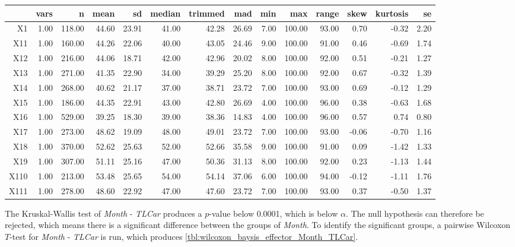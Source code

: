 \begin{tabular}{rrrrrrrrrrrrrr}
  \hline
 & vars & n & mean & sd & median & trimmed & mad & min & max & range & skew & kurtosis & se \\ 
  \hline
X1 & 1.00 & 118.00 & 44.60 & 23.91 & 41.00 & 42.28 & 26.69 & 7.00 & 100.00 & 93.00 & 0.70 & -0.32 & 2.20 \\ 
  X11 & 1.00 & 160.00 & 44.26 & 22.06 & 40.00 & 43.05 & 24.46 & 9.00 & 100.00 & 91.00 & 0.46 & -0.69 & 1.74 \\ 
  X12 & 1.00 & 216.00 & 44.06 & 18.71 & 42.00 & 42.96 & 20.02 & 8.00 & 100.00 & 92.00 & 0.51 & -0.21 & 1.27 \\ 
  X13 & 1.00 & 271.00 & 41.35 & 22.90 & 34.00 & 39.29 & 25.20 & 8.00 & 100.00 & 92.00 & 0.67 & -0.32 & 1.39 \\ 
  X14 & 1.00 & 268.00 & 40.62 & 21.17 & 37.00 & 38.71 & 23.72 & 7.00 & 100.00 & 93.00 & 0.69 & -0.12 & 1.29 \\ 
  X15 & 1.00 & 186.00 & 44.35 & 22.91 & 43.00 & 42.80 & 26.69 & 4.00 & 100.00 & 96.00 & 0.38 & -0.63 & 1.68 \\ 
  X16 & 1.00 & 529.00 & 39.25 & 18.30 & 39.00 & 38.36 & 14.83 & 4.00 & 100.00 & 96.00 & 0.57 & 0.74 & 0.80 \\ 
  X17 & 1.00 & 273.00 & 48.62 & 19.09 & 48.00 & 49.01 & 23.72 & 7.00 & 100.00 & 93.00 & -0.06 & -0.70 & 1.16 \\ 
  X18 & 1.00 & 370.00 & 52.62 & 25.63 & 52.00 & 52.66 & 35.58 & 9.00 & 100.00 & 91.00 & 0.09 & -1.42 & 1.33 \\ 
  X19 & 1.00 & 307.00 & 51.11 & 25.16 & 47.00 & 50.36 & 31.13 & 8.00 & 100.00 & 92.00 & 0.23 & -1.13 & 1.44 \\ 
  X110 & 1.00 & 213.00 & 53.48 & 25.65 & 54.00 & 54.14 & 37.06 & 6.00 & 100.00 & 94.00 & -0.12 & -1.11 & 1.76 \\ 
  X111 & 1.00 & 278.00 & 48.60 & 22.92 & 47.00 & 47.60 & 23.72 & 7.00 & 100.00 & 93.00 & 0.37 & -0.50 & 1.37 \\ 
   \hline
\end{tabular}

The Kruskal-Wallis test of \textit{Month} - \textit{TLCar} produces a $p$-value below 0.0001, which is below $\alpha$. The null hypothesis can therefore be rejected, which means there is a significant difference between the groups of \textit{Month}. To identify the significant groups, a pairwise Wilcoxon $T$-test for \textit{Month} - \textit{TLCar} is run, which produces \cref{tbl:wilcoxon_baysis_effector_Month_TLCar}. 

